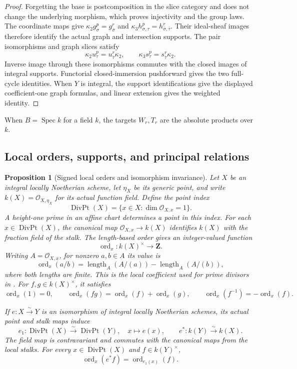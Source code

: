 \documentclass[11pt]{article}
\newtheorem{proposition}[theorem]{Proposition}
\theoremstyle{definition}
\theoremstyle{remark}
\DeclareMathOperator{\Spec}{Spec}
\begin{document}
\begin{proof}
Forgetting the base is postcomposition in the slice category and does
not change the underlying morphism, which proves injectivity and the
group laws. The coordinate maps give
\(\kappa_2g^p_\sigma=g^r_{\bar\sigma}\) and
\(\kappa_3h^p_{\sigma,\tau}=h^r_{\bar\sigma,\bar\tau}\).
Their ideal-sheaf images therefore identify the actual graph and
intersection supports. The pair isomorphisms and graph slices satisfy
\[
  \kappa_2u^p_\tau=u^r_{\bar\tau}\kappa_2,
  \qquad \kappa_3s^p_\tau=s^r_{\bar\tau}\kappa_2.
\]
Inverse image through these isomorphisms commutes with the closed images
of integral supports. Functorial closed-immersion pushforward gives the
two full-cycle identities. When \(Y\) is integral, the support
identifications give the displayed coefficient-one graph formulas, and
linear extension gives the weighted identity.
\end{proof}

When \(B=\Spec k\) for a field \(k\), the targets \(W_r,T_r\) are the
absolute products over \(k\).

\subsection{Local orders, supports, and principal relations}
\label{app:cycles}

\begin{proposition}[Signed local orders and isomorphism invariance]
\label{prop:scheme-local-order}
Let \(X\) be an integral locally Noetherian scheme, let \(\eta_X\) be
its generic point, and write \(k(X)=\mathcal O_{X,\eta_X}\) for its
actual function field. Define the point index
\[
  \operatorname{DivPt}(X)
    =\{x\in X:\dim\mathcal O_{X,x}=1\}.
\]
A height-one prime in an affine chart determines a point in this index.
For each \(x\in\operatorname{DivPt}(X)\), the canonical map
\(\mathcal O_{X,x}\to k(X)\) identifies \(k(X)\) with the fraction
field of the stalk. The length-based order
\cite{StacksLocalOrderOfVanishing} gives an integer-valued function
\[
  \operatorname{ord}_x:k(X)^\times\longrightarrow\mathbf Z.
\]
Writing \(A=\mathcal O_{X,x}\), for nonzero \(a,b\in A\) its value is
\[
  \operatorname{ord}_x(a/b)
    =\operatorname{length}_A(A/(a))
       -\operatorname{length}_A(A/(b)),
\]
where both lengths are finite. This is the local coefficient used for
prime divisors in \cite{StacksSchemeOrderOfVanishing}. For
\(f,g\in k(X)^\times\), it satisfies
\[
  \operatorname{ord}_x(1)=0,\qquad
  \operatorname{ord}_x(fg)=\operatorname{ord}_x(f)+\operatorname{ord}_x(g),
  \qquad \operatorname{ord}_x(f^{-1})=-\operatorname{ord}_x(f).
\]

If \(e:X\xrightarrow{\sim}Y\) is an isomorphism of integral locally
Noetherian schemes, its actual point and stalk maps induce
\[
  e_1:\operatorname{DivPt}(X)\xrightarrow{\sim}\operatorname{DivPt}(Y),
  \quad x\longmapsto e(x),
  \qquad e^*:k(Y)\xrightarrow{\sim}k(X).
\]
The field map is contravariant and commutes with the canonical maps from
the local stalks. For every \(x\in\operatorname{DivPt}(X)\) and
\(f\in k(Y)^\times\),
\[
  \operatorname{ord}_x(e^*f)=\operatorname{ord}_{e_1(x)}(f).
\]
\end{proposition}
\end{document}
